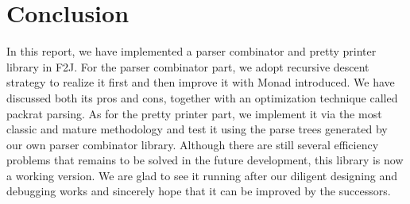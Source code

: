\chapter{Conclusion}
In this report, we have implemented a parser combinator and pretty printer library in F2J. For the parser combinator part, we adopt recursive descent strategy to realize it first and then improve it with Monad introduced. We have discussed both its pros and cons, together with an optimization technique called packrat parsing. As for the pretty printer part, we implement it via the most classic and mature methodology and test it using the parse trees generated by our own parser combinator library. Although there are still several efficiency problems that remains to be solved in the future development, this library is now a working version. We are glad to see it running after our diligent designing and debugging works and sincerely hope that it can be improved by the successors.

